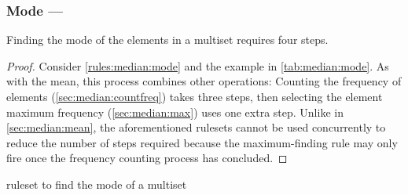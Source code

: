 \subsubsection{Mode --- }  \label{sec:median:mode}

\begin{proposition}\label{prop:median:mode}
Finding the mode of the elements in a multiset requires four steps.
\end{proposition}

\begin{proof}
Consider \cref{rules:median:mode} and the example in \cref{tab:median:mode}.  As with the mean, this process combines other operations:  Counting the frequency of elements (\cref{sec:median:countfreq}) takes three steps, then selecting the element maximum frequency (\cref{sec:median:max}) uses one extra step.  Unlike in \cref{sec:median:mean}, the aforementioned \glspl{ruleset} cannot be used concurrently to reduce the number of steps required because the maximum-finding rule may only fire once the frequency counting process has concluded.
\end{proof}

\begin{cprulesetfloat}
\begin{cpruleset}




\end{cpruleset}
\caption{\label{rules:median:mode}\Gls{ruleset} to find the mode of a multiset}
\end{cprulesetfloat}

